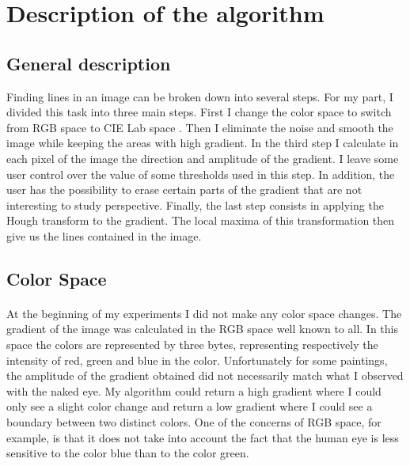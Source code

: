 \documentclass{article}
\begin{document}
	\section{Description of the algorithm}
	

	\subsection{General description}
	
	Finding lines in an image can be broken down into several steps. For my part, I divided this task into three main steps. First I change the color space to switch from RGB space to CIE Lab space \cite{cielab}. Then I eliminate the noise and smooth the image while keeping the areas with high gradient. In the third step I calculate in each pixel of the image the direction and amplitude of the gradient. I leave some user control over the value of some thresholds used in this step. In addition, the user has the possibility to erase certain parts of the gradient that are not interesting to study perspective. Finally, the last step consists in applying the Hough transform to the gradient. The local maxima of this transformation then give us the lines contained in the image.	
	
	\subsection{Color Space}
	
	\paragraph{}
	At the beginning of my experiments I did not make any color space changes. The gradient of the image was calculated in the RGB space well known to all. In this space the colors are represented by three bytes, representing respectively the intensity of red, green and blue in the color. Unfortunately for some paintings, the amplitude of the gradient obtained did not necessarily match what I observed with the naked eye. My algorithm could return a high gradient where I could only see a slight color change and return a low gradient where I could see a boundary between two distinct colors. One of the concerns of RGB space, for example, is that it does not take into account the fact that the human eye is less sensitive to the color blue than to the color green.
	
\end{document}
